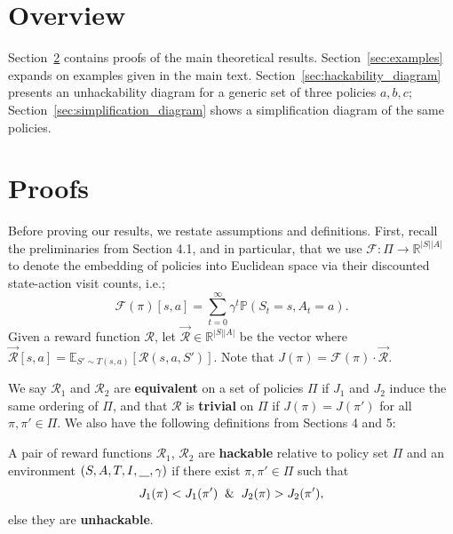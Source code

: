 \appendix

\setcounter{proposition}{0}
\setcounter{theorem}{0}
\setcounter{lemma}{0}
\setcounter{corollary}{0}
\setcounter{definition}{0}


\section{Overview}
Section~\ref{sec:proofs} contains proofs of the main theoretical results.
Section~\ref{sec:examples} expands on examples given in the main text.
Section~\ref{sec:hackability_diagram} presents an unhackability diagram for a generic set of three policies $a, b, c$; Section~\ref{sec:simplification_diagram} shows a simplification diagram of the same policies.

\section{Proofs} \label{sec:proofs}

Before proving our results, we restate assumptions and definitions.
First, recall the preliminaries from Section 4.1, and in particular, that we use $\mathcal{F}: \Pi \rightarrow \mathbb{R}^{|S||A|}$ to denote the embedding of policies into Euclidean space via their discounted state-action visit counts, i.e.;
$$
\mathcal{F}(\pi)[s,a] = \sum_{t=0}^\infty \gamma^t \mathbb{P}(S_t = s, A_t = a).
$$
Given a reward function $\mathcal{R}$, let $\vec{\mathcal{R}} \in \mathbb{R}^{|S||A|}$ be the vector where $\vec{\mathcal{R}}[s,a] = \mathbb{E}_{S' \sim T(s,a)}[\mathcal{R}(s,a,S')]$. Note that $J(\pi) = \mathcal{F}(\pi)\cdot \vec{\mathcal{R}}$.

We say $\mathcal{R}_1$ and $\mathcal{R}_2$ are \textbf{equivalent} on a set of policies $\Pi$ if $J_1$ and $J_2$ induce the same ordering of $\Pi$, and that $\mathcal{R}$ is \textbf{trivial} on $\Pi$ if $J(\pi) = J(\pi')$ for all $\pi,\pi' \in \Pi$. 
We also have the following definitions from Sections 4 and 5:

\begin{definition}\label{def:unhackable}
A pair of reward functions $\mathcal{R}_1$, $\mathcal{R}_2$ are \textbf{hackable} relative to policy set $\Pi$ and an environment $(S,A,T,I,\underline{\hspace*{0.3cm}},\gamma)$ if 
there exist $\pi,\pi' \in \Pi$ such that  
$$
J_1(\pi) < J_1(\pi') \And J_2(\pi) > J_2(\pi'),
$$
else they are \textbf{unhackable}.
\end{definition}



